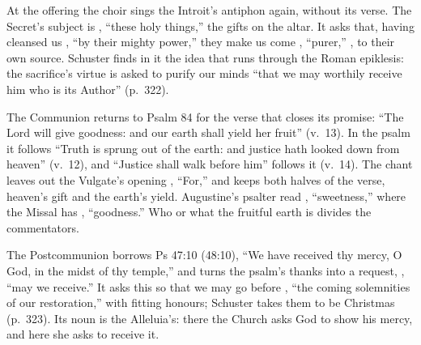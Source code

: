 At the offering the choir sings the Introit's antiphon again, without its
verse. The Secret's subject is , ``these holy things,'' the
gifts on the altar. It asks that, having cleansed us , ``by their mighty power,'' they make us come ,
``purer,'' , to their own source. Schuster finds in
it the idea that runs through the Roman epiklesis: the sacrifice's virtue is
asked to purify our minds ``that we may worthily receive him who is its
Author'' (p.~322).

The Communion returns to Psalm 84 for the verse that closes its promise: ``The
Lord will give goodness: and our earth shall yield her fruit'' (v.~13). In the
psalm it follows ``Truth is sprung out of the earth: and justice hath looked
down from heaven'' (v.~12), and ``Justice shall walk before him'' follows it
(v.~14). The chant leaves out the Vulgate's opening
, ``For,'' and keeps both halves of the verse, heaven's gift and
the earth's yield. Augustine's psalter read ,
``sweetness,'' where the Missal has , ``goodness.'' Who or
what the fruitful earth is divides the commentators.

The Postcommunion borrows Ps 47:10 (48:10), ``We have received thy mercy, O
God, in the midst of thy temple,'' and turns the psalm's thanks into a
request, , ``may we receive.'' It asks this so that we may
go before , ``the coming
solemnities of our restoration,'' with fitting honours; Schuster takes them to
be Christmas (p.~323). Its noun  is the Alleluia's: there
the Church asks God to show his mercy, and here she asks to receive it.
